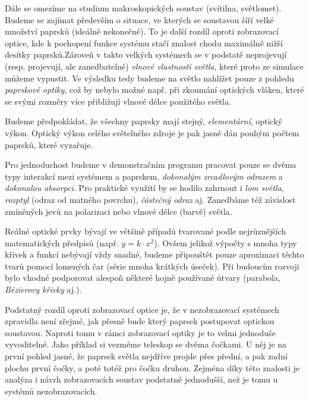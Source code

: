Dále se omezíme na studium makroskopických soustav (svítilna, světlomet). Budeme se zajímat především o situace, ve kterých se soustavou šíří velké množství paprsků (ideálně nekonečné). To je další rozdíl oproti zobrazovací optice, kde k pochopení funkce systému stačí znalost chodu maximálně nižší desítky paprsků.\src Zároveň v takto velkých systémech se v podstatě neprojevují (resp. projevují, ale zanedbatelně) \emph{vlnové vlastnosti světla}, které proto ze simulace můžeme vypustit. Ve výsledku tedy budeme na světlo nahlížet pouze z pohledu \emph{paprskové optiky}, což by nebylo možné např. při zkoumání optických vláken, které se svými rozměry více přibližují vlnové délce použitého světla.

Budeme předpokládat, že všechny paprsky mají stejný, \emph{elementární}, optický výkon. Optický výkon celého světelného zdroje je pak jasně dán pouhým počtem paprsků, které vyzařuje.

Pro jednoduchost budeme v demonstračním programu pracovat pouze se dvěma typy interakcí mezi systémem a paprskem, \emph{dokonalým zrcadlovým odrazem} a \emph{dokonalou absorpci}. Pro praktické využití by se hodilo zahrnout i \emph{lom světla}, \emph{rozptyl} (odraz od matného povrchu), \emph{částečný odraz} aj. Zanedbáme též závislost zmíněných jevů na polarizaci nebo vlnové délce (barvě) světla.



Reálné optické prvky bývají ve většině případů tvarované podle nejrůznějších matematických předpisů (např. $y = k \cdot x^2$). Ovšem jelikož výpočty s mnoha typy křivek a funkcí nebývají vždy snadné, budeme připouštět pouze aproximaci těchto tvarů pomocí lomených čar (série mnoha krátkých úseček). Při budoucím rozvoji bylo vhodné podporovat alespoň některé hojně používané útvary (parabola, \emph{Bézierovy křivky} aj.).


Podstatný rozdíl oproti zobrazovací optice je, že v nezobrazovací systémech zpravidla není zřejmé, jak přesně bude který paprsek postupovat optickou soustavou. Naproti tomu v rámci zobrazovací optiky je to velmi jednoduše vyvoditelné. Jako příklad si vezměme teleskop se dvěma čočkami. U něj je na první pohled jasné, že paprsek světla nejdříve projde přes přední, a pak zadní plochu první čočky, a poté totéž pro čočku druhou. Zejména díky této znalosti je analýza i návrh zobrazovacích soustav podstatně jednodušší, než je tomu u systémů nezobrazovacích.
